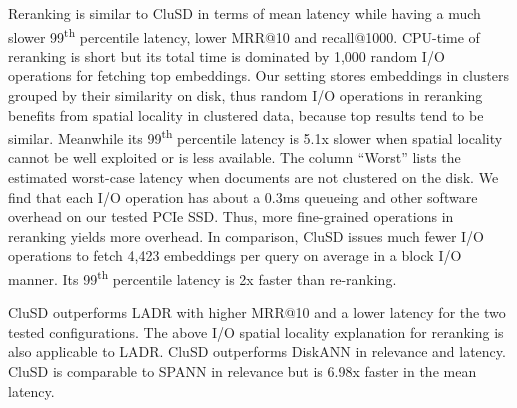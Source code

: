 
Reranking is similar to CluSD in terms of  mean latency while having a much slower 99\textsuperscript{th} percentile latency, lower MRR@10 and  recall@1000.%
CPU-time of reranking is short but its total time is dominated by 1,000 random I/O operations for fetching top embeddings. 
Our setting stores embeddings in clusters grouped by their similarity on disk, thus
random I/O operations in reranking  benefits from spatial locality in clustered data, because top results tend to 
be similar. Meanwhile  its  99\textsuperscript{th} percentile latency is 5.1x slower when  spatial locality cannot be well exploited or  is 
less available. 
The column ``Worst'' lists  the estimated worst-case latency when documents are not clustered on the disk. 
We find that  each  I/O operation has about a 0.3ms queueing and other software overhead on our tested PCIe SSD.
Thus, more fine-grained operations in reranking yields more overhead.
In comparison, CluSD issues  much fewer  I/O operations to fetch 4,423 embeddings per query on average in a block I/O manner.
Its 99\textsuperscript{th} percentile latency is 2x faster than re-ranking.

CluSD outperforms LADR with higher MRR@10 and a lower latency for the two tested configurations.
The above I/O spatial locality  explanation for reranking is also applicable to LADR.  
CluSD outperforms  DiskANN in relevance and latency.
CluSD is comparable to SPANN in relevance  but is 6.98x faster in the mean latency.


